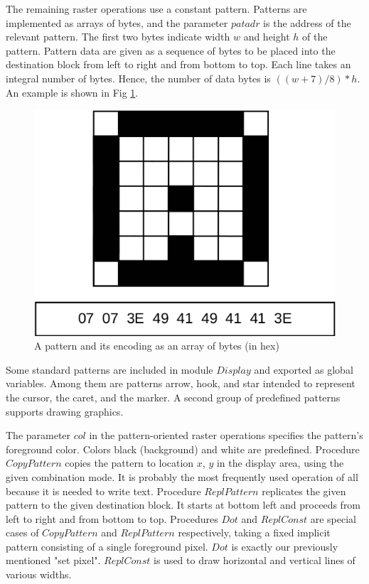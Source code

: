 The remaining raster operations use a constant pattern. Patterns are implemented as arrays of
bytes, and the parameter $patadr$ is the address of the relevant pattern. The first two bytes indicate
width $w$ and height $h$ of the pattern. Pattern data are given as a sequence of bytes to be placed
into the destination block from left to right and from bottom to top. Each line takes an integral
number of bytes. Hence, the number of data bytes is $((w+7) / 8) * h$. An example is shown in Fig \ref{fig:pattern}.
\begin{figure}
	\centering
	\includegraphics[width=.6\textwidth]{i/b}
	\caption{A pattern and its encoding as an array of bytes (in hex)}
	\label{fig:pattern}
\end{figure}

Some standard patterns are included in module $Display$ and exported as global variables. Among
them are patterns arrow, hook, and star intended to represent the cursor, the caret, and the
marker. A second group of predefined patterns supports drawing graphics.

The parameter $col$ in the pattern-oriented raster operations specifies the pattern's foreground
color. Colors black (background) and white are predefined. Procedure $CopyPattern$ copies the
pattern to location $x$, $y$ in the display area, using the given combination mode. It is probably the
most frequently used operation of all because it is needed to write text. Procedure $ReplPattern$
replicates the given pattern to the given destination block. It starts at bottom left and proceeds
from left to right and from bottom to top. Procedures $Dot$ and $ReplConst$ are special cases of
$CopyPattern$ and $ReplPattern$ respectively, taking a fixed implicit pattern consisting of a single
foreground pixel. $Dot$ is exactly our previously mentioned "set pixel". $ReplConst$ is used to draw
horizontal and vertical lines of various widths.


